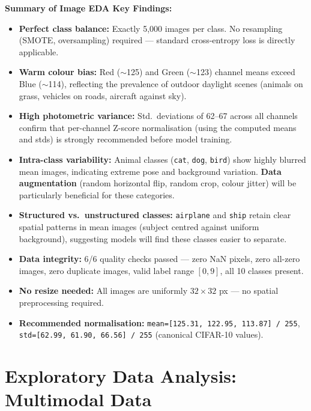 \documentclass[twoside]{hcmut-report}
\begin{document}
\begin{importantbox}
\textbf{Summary of Image EDA Key Findings:}
\begin{itemize}
    \item \textbf{Perfect class balance:} Exactly 5{,}000 images per class. No resampling (SMOTE, oversampling) required --- standard cross-entropy loss is directly applicable.
    \item \textbf{Warm colour bias:} Red ($\sim$125) and Green ($\sim$123) channel means exceed Blue ($\sim$114), reflecting the prevalence of outdoor daylight scenes (animals on grass, vehicles on roads, aircraft against sky).
    \item \textbf{High photometric variance:} Std.\ deviations of 62--67 across all channels confirm that per-channel Z-score normalisation (using the computed means and stds) is strongly recommended before model training.
    \item \textbf{Intra-class variability:} Animal classes (\texttt{cat}, \texttt{dog}, \texttt{bird}) show highly blurred mean images, indicating extreme pose and background variation. \textbf{Data augmentation} (random horizontal flip, random crop, colour jitter) will be particularly beneficial for these categories.
    \item \textbf{Structured vs.\ unstructured classes:} \texttt{airplane} and \texttt{ship} retain clear spatial patterns in mean images (subject centred against uniform background), suggesting models will find these classes easier to separate.
    \item \textbf{Data integrity:} 6/6 quality checks passed --- zero NaN pixels, zero all-zero images, zero duplicate images, valid label range $[0, 9]$, all 10 classes present.
    \item \textbf{No resize needed:} All images are uniformly $32\times32$ px --- no spatial preprocessing required.
    \item \textbf{Recommended normalisation:} \texttt{mean=[125.31, 122.95, 113.87] / 255}, \texttt{std=[62.99, 61.90, 66.56] / 255} (canonical CIFAR-10 values).
\end{itemize}
\end{importantbox}

\section{Exploratory Data Analysis: Multimodal Data}
\label{sec:multi}
\end{document}
